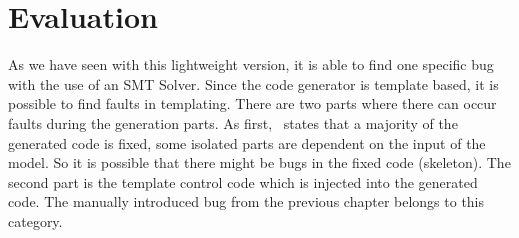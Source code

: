 \section{Evaluation}\label{sec:ch3-evalution}
As we have seen with this lightweight version, it is able to find one specific bug with the use of an SMT Solver. Since the code generator is template based, it is possible to find faults in templating. There are two parts where there can occur faults during the generation parts. As first,~\cite[p.274]{voelter2013dsl} states that a majority of the generated code is fixed, some isolated parts are dependent on the input of the model. So it is possible that there might be bugs in the fixed code (skeleton). The second part is the template control code which is injected into the generated code. The manually introduced bug from the previous chapter belongs  to this category.


